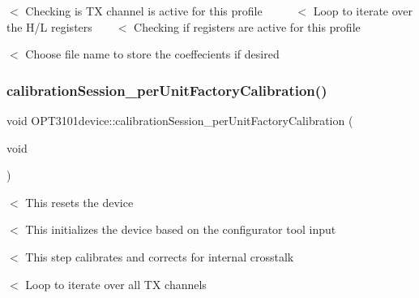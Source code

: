 $<$ Checking is TX channel is active for this profile ~\newline
~\newline
~\newline
 $<$ Loop to iterate over the H/L registers ~\newline
~\newline
 $<$ Checking if registers are active for this profile

$<$ Choose file name to store the coeffecients if desired \mbox{\label{class_o_p_t3101device_a873af9bc068728c4ded36435065b448c}} 
\subsubsection{\texorpdfstring{calibration\+Session\+\_\+per\+Unit\+Factory\+Calibration()}{calibrationSession\_perUnitFactoryCalibration()}}
{\footnotesize\ttfamily void O\+P\+T3101device\+::calibration\+Session\+\_\+per\+Unit\+Factory\+Calibration (\begin{DoxyParamCaption}\item[{void}]{ }\end{DoxyParamCaption})}

$<$ This resets the device

$<$ This initializes the device based on the configurator tool input

$<$ This step calibrates and corrects for internal crosstalk

$<$ Loop to iterate over all TX channels

